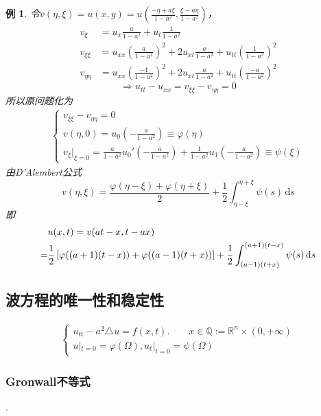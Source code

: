 \documentclass[11pt, a4paper]{article}
\theoremstyle{theorem}
\newtheorem{eg}[thm]{例}
\newcommand{\intd}[1]{\,\mathrm{d}{#1}}
\begin{document}
\begin{eg}
令$v(\eta, \xi) = u(x,y) = u(\frac{-\eta + a\xi}{1 - a^2}, \frac{\xi - a \eta}{1 - a^2})$，
\begin{align*}
    v_\xi &= u_x \frac{a}{1-a^2} + u_t \frac{1}{1-a^2} \\
    v_{\xi\xi} &= u_{xx}(\frac{a}{1-a^2})^2 + 2 u_{xt} \frac{a}{1-a^2} + u_{tt} (\frac{1}{1-a^2})^2 \\
    v_{\eta\eta} &= u_{xx} (\frac{-1}{1 - a^2})^2  + 2 u_{xt} \frac{a}{1 - a^2} + u_{tt} (\frac{-a}{1-a^2})^2
\end{align*}
$$
\Longrightarrow u_{tt} - u_{xx} = v_{\xi\xi} - v_{\eta\eta} = 0
$$
所以原问题化为
\begin{align}
    \begin{cases}
    v_{\xi\xi} - v_{\eta\eta} = 0 \\
    v(\eta, 0) = u_0(-\frac{a}{1-a^2}) \equiv \varphi(\eta)\\
    v_\xi |_{\xi = 0} = \frac{a}{1-a^2} u_0'(-\frac{a}{1-a^2}) + \frac{1}{1-a^2} u_1(-\frac{a}{1-a^2}) \equiv \psi(\xi)
    \end{cases}
\end{align}
由D'Alembert公式
$$
v(\eta, \xi) = \frac{\varphi(\eta - \xi) + \varphi(\eta + \xi)}{2} + \frac{1}{2} \int_{\eta - \xi}^{\eta + \xi} \psi(s) \intd s
$$
即
\begin{align}
    &u(x,t) = v(at - x, t - ax) \notag \\
    = &\frac{1}{2} \left[\varphi((a+1)(t-x)) + \varphi((a-1)(t+x))\right] + \frac{1}{2} \int_{(a-1)(t+x)}^{(a+1)(t-x)} \psi(s) \intd s
\end{align}
\end{eg}

\subsection{波方程的唯一性和稳定性}

\begin{align}
    \label{func3-21}
    \begin{cases}
    u_{tt} - a^2 \triangle u = f(x,t). \quad \quad x \in \mathbb{Q}:= \mathbb{R}^n \times (0, +\infty) \\
    u|_{t = 0} = \varphi(\Omega), u_t|_{t = 0} = \psi(\Omega)
    \end{cases}
\end{align}

\subsubsection{Gronwall不等式}.
\end{document}
